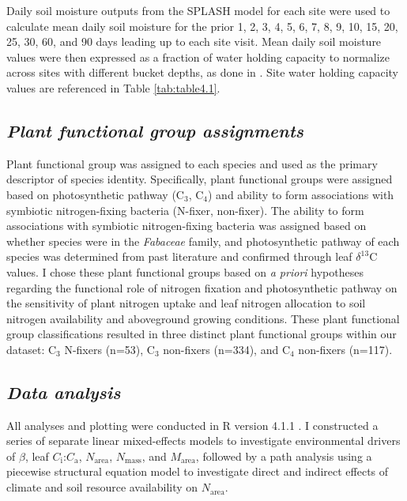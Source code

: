 Daily soil moisture outputs from the SPLASH model for each site were used to calculate mean daily soil moisture for the prior 1, 2, 3, 4, 5, 6, 7, 8, 9, 10, 15, 20, 25, 30, 60, and 90 days leading up to each site visit. Mean daily soil moisture values were then expressed as a fraction of water holding capacity to normalize across sites with different bucket depths, as done in . Site water holding capacity values are referenced in Table \ref{tab:table4.1}.

\subsection{\textit{Plant functional group assignments}}
\noindent Plant functional group was assigned to each species and used as the primary descriptor of species identity. Specifically, plant functional groups were assigned based on photosynthetic pathway (C$_3$, C$_4$) and ability to form associations with symbiotic nitrogen-fixing bacteria (N-fixer, non-fixer). The ability to form associations with symbiotic nitrogen-fixing bacteria was assigned based on whether species were in the \textit{Fabaceae} family, and photosynthetic pathway of each species was determined from past literature and confirmed through leaf $\delta^{13}$C values. I chose these plant functional groups based on \textit{a priori} hypotheses regarding the functional role of nitrogen fixation and photosynthetic pathway on the sensitivity of plant nitrogen uptake and leaf nitrogen allocation to soil nitrogen availability and aboveground growing conditions. These plant functional group classifications resulted in three distinct plant functional groups within our dataset: C$_3$ N-fixers (n=53), C$_3$ non-fixers (n=334), and C$_4$ non-fixers (n=117).

\subsection{\textit{Data analysis}}
\noindent All analyses and plotting were conducted in R version 4.1.1 . I constructed a series of separate linear mixed-effects models to investigate environmental drivers of $\beta$, leaf $C_\mathrm{i}$:$C_\mathrm{a}$, $N_\mathrm{area}$, $N_\mathrm{mass}$, and $M_\mathrm{area}$, followed by a path analysis using a piecewise structural equation model to investigate direct and indirect effects of climate and soil resource availability on $N_\mathrm{area}$.

